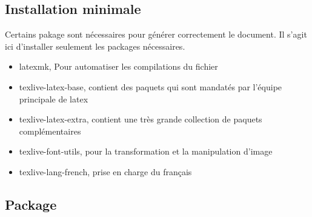 \subsection{Installation minimale}
Certains pakage sont nécessaires pour générer correctement le document.
Il s'agit ici d'installer seulement les packages nécessaires.
\begin{itemize}
    \item latexmk, Pour automatiser les compilations du fichier
    \item texlive-latex-base, contient des paquets qui sont mandatés par l'équipe principale de \gls{latex}
    \item texlive-latex-extra, contient une très grande collection de paquets complémentaires
    \item texlive-font-utils, pour la transformation et la manipulation d'image
    \item texlive-lang-french, prise en charge du français
\end{itemize}

\subsection{Package}

